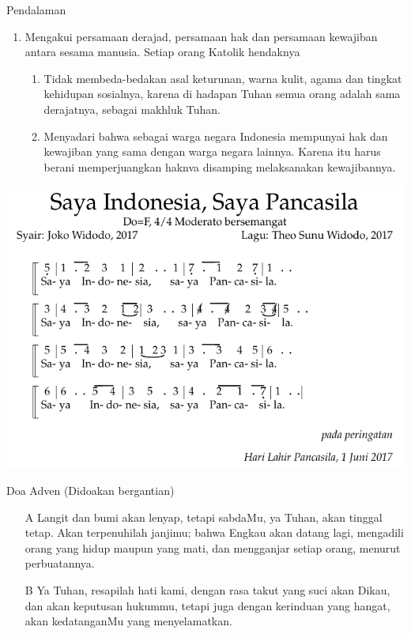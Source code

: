 \documentclass[11pt]{beamer}
\begin{document}
\begin{frame}{Pendalaman}
\begin{enumerate}	
\item Mengakui persamaan derajad, persamaan hak
dan persamaan kewajiban antara sesama
manusia.
Setiap orang Katolik hendaknya
\begin{enumerate}
\item Tidak membeda-bedakan asal
keturunan, warna kulit, agama dan
tingkat kehidupan sosialnya, karena di
hadapan Tuhan semua orang adalah
sama derajatnya, sebagai makhluk
Tuhan.
\item Menyadari bahwa sebagai warga negara
Indonesia mempunyai hak dan
kewajiban yang sama dengan warga
negara lainnya. Karena itu harus berani
memperjuangkan haknva disamping
melaksanakan kewajibannya.
\end{enumerate}
\end{enumerate}
\end{frame}

\begin{frame}
	\begin{center}
		\includegraphics[scale=0.6]{saya-indonesia.png}
	\end{center}
\end{frame}

\begin{frame}{Doa Adven (Didoakan bergantian)}
\begin{enumerate}
\item [A] Langit dan bumi akan lenyap, tetapi sabdaMu, ya Tuhan,
akan tinggal tetap. Akan terpenuhilah janjimu; bahwa
Engkau akan datang lagi, mengadili orang yang hidup
maupun yang mati, dan mengganjar setiap orang, menurut
perbuatannya.
\item [B] Ya Tuhan, resapilah hati kami, dengan rasa takut yang
suci akan Dikau, dan akan keputusan hukummu, tetapi
juga dengan kerinduan yang hangat, akan kedatanganMu
yang menyelamatkan.
\end{enumerate}
\end{frame}
\end{document}
